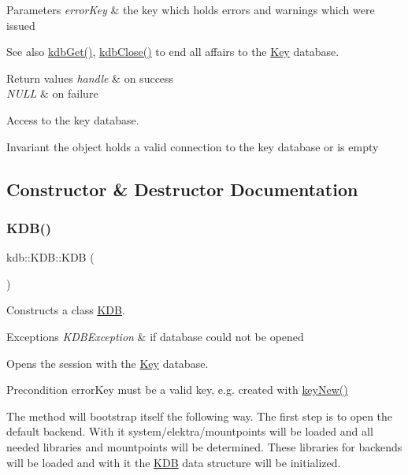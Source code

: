 \begin{DoxyParams}{Parameters}
{\em error\+Key} & the key which holds errors and warnings which were issued \\
\hline
\end{DoxyParams}
\begin{DoxySeeAlso}{See also}
\hyperlink{group__kdb_ga28e385fd9cb7ccfe0b2f1ed2f62453a1}{kdb\+Get()}, \hyperlink{group__kdb_gadb54dc9fda17ee07deb9444df745c96f}{kdb\+Close()} to end all affairs to the \hyperlink{group__key}{Key} database. 
\end{DoxySeeAlso}

\begin{DoxyRetVals}{Return values}
{\em handle} & on success \\
\hline
{\em N\+U\+LL} & on failure\\
\hline
\end{DoxyRetVals}
Access to the key database.

\begin{DoxyInvariant}{Invariant}
the object holds a valid connection to the key database or is empty 
\end{DoxyInvariant}


\subsection{Constructor \& Destructor Documentation}
\mbox{\label{classkdb_1_1KDB_a7e0637995ce9f294cdbc6f167df6db40}} 
\subsubsection{\texorpdfstring{K\+D\+B()}{KDB()}\hspace{0.1cm}{\footnotesize\ttfamily [1/2]}}
{\footnotesize\ttfamily kdb\+::\+K\+D\+B\+::\+K\+DB (\begin{DoxyParamCaption}{ }\end{DoxyParamCaption})\hspace{0.3cm}{\ttfamily [inline]}}



Constructs a class \hyperlink{classkdb_1_1KDB}{K\+DB}. 


\begin{DoxyExceptions}{Exceptions}
{\em K\+D\+B\+Exception} & if database could not be opened\\
\hline
\end{DoxyExceptions}
Opens the session with the \hyperlink{classkdb_1_1Key}{Key} database. \begin{DoxyPrecond}{Precondition}
error\+Key must be a valid key, e.\+g. created with \hyperlink{group__key_gad23c65b44bf48d773759e1f9a4d43b89}{key\+New()}
\end{DoxyPrecond}
The method will bootstrap itself the following way. The first step is to open the default backend. With it system/elektra/mountpoints will be loaded and all needed libraries and mountpoints will be determined. These libraries for backends will be loaded and with it the {\ttfamily \hyperlink{classkdb_1_1KDB}{K\+DB}} data structure will be initialized.

